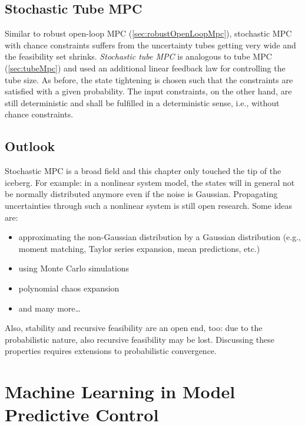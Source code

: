 	\section{Stochastic Tube MPC}
		Similar to robust open-loop MPC (\autoref{sec:robustOpenLoopMpc}), stochastic MPC with chance constraints suffers from the uncertainty tubes getting very wide and the feasibility set shrinks. \emph{Stochastic tube MPC} is analogous to tube MPC (\autoref{sec:tubeMpc}) and used an additional linear feedback law for controlling the tube size. As before, the state tightening is chosen such that the constraints are satisfied with a given probability. The input constraints, on the other hand, are still deterministic and shall be fulfilled in a deterministic sense, i.e., without chance constraints.

	\section{Outlook}
		Stochastic MPC is a broad field and this chapter only touched the tip of the iceberg. For example: in a nonlinear system model, the states will in general not be normally distributed anymore even if the noise is Gaussian. Propagating uncertainties through such a nonlinear system is still open research. Some ideas are:
		\begin{itemize}
			\item approximating the non-Gaussian distribution by a Gaussian distribution (e.g., moment matching, Taylor series expansion, mean predictions, etc.)
			\item using Monte Carlo simulations
			\item polynomial chaos expansion
			\item and many more\dots
		\end{itemize}
		Also, stability and recursive feasibility are an open end, too: due to the probabilistic nature, also recursive feasibility may be lost. Discussing these properties requires extensions to probabilistic convergence.

\chapter{Machine Learning in Model Predictive Control}
	\label{c:ml}

